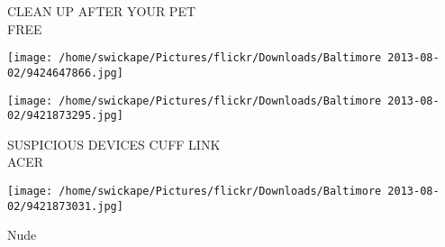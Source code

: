 \documentclass[10pt,letterpaper]{article}
\begin{document}
CLEAN UP AFTER YOUR PET\\
FREE\\
\pagebreak

\texttt{[image: /home/swickape/Pictures/flickr/Downloads/Baltimore 2013-08-02/9424647866.jpg]}

\vspace{0.25in}
\texttt{[image: /home/swickape/Pictures/flickr/Downloads/Baltimore 2013-08-02/9421873295.jpg]}

SUSPICIOUS DEVICES CUFF LINK\\
ACER\\
\pagebreak

\texttt{[image: /home/swickape/Pictures/flickr/Downloads/Baltimore 2013-08-02/9421873031.jpg]}

Nude\\
\pagebreak
\end{document}
